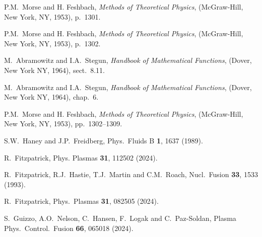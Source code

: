 \documentclass[12pt,prb,aps]{revtex4-1}
\begin{document}
\begin{thebibliography}{99}
 P.M.~Morse and H. Feshbach, {\em Methods of Theoretical Physics}, (McGraw-Hill, New York, NY, 1953), p.~1301.

 P.M.~Morse and H. Feshbach, {\em Methods of Theoretical Physics}, (McGraw-Hill, New York, NY, 1953), p.~1302.

 M.~Abramowitz and I.A.~Stegun, {\em Handbook of Mathematical Functions}, (Dover, New York NY, 1964), sect.~8.11.

 M.~Abramowitz and I.A.~Stegun, {\em Handbook of Mathematical Functions}, (Dover, New York NY, 1964), chap.~6.

 P.M.~Morse and H. Feshbach, {\em Methods of Theoretical Physics}, (McGraw-Hill, New York, NY, 1953), pp.~1302--1309.

 S.W.~Haney and J.P.~Freidberg, Phys.\ Fluids B {\bf 1}, 1637 (1989).

 R.~Fitzpatrick, Phys. Plasmas {\bf 31}, 112502 (2024).

 R.~Fitzpatrick, R.J.~Hastie, T.J.~Martin and C.M.~Roach, Nucl.\ Fusion {\bf 33}, 1533 (1993).

 R.~Fitzpatrick, Phys.\ Plasmas {\bf 31}, 082505 (2024).


 S.~Guizzo, A.O.~Nelson, C.~Hansen, F.~Logak and C.~Paz-Soldan, Plasma Phys.\ Control.\ Fusion {\bf 66},  065018  (2024).  

\end{thebibliography}
\end{document}
